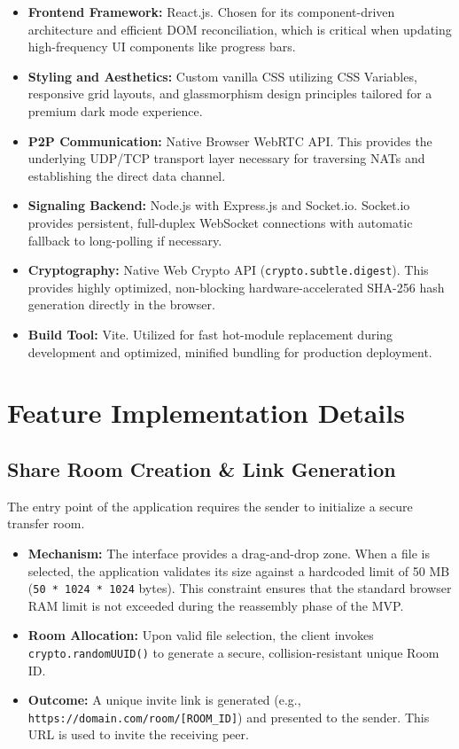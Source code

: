 \documentclass[12pt, a4paper]{article}
\begin{document}
\begin{itemize}
    \item \textbf{Frontend Framework:} React.js. Chosen for its component-driven architecture and efficient DOM reconciliation, which is critical when updating high-frequency UI components like progress bars.
    \item \textbf{Styling and Aesthetics:} Custom vanilla CSS utilizing CSS Variables, responsive grid layouts, and glassmorphism design principles tailored for a premium dark mode experience.
    \item \textbf{P2P Communication:} Native Browser WebRTC API. This provides the underlying UDP/TCP transport layer necessary for traversing NATs and establishing the direct data channel.
    \item \textbf{Signaling Backend:} Node.js with Express.js and Socket.io. Socket.io provides persistent, full-duplex WebSocket connections with automatic fallback to long-polling if necessary.
    \item \textbf{Cryptography:} Native Web Crypto API (\texttt{crypto.subtle.digest}). This provides highly optimized, non-blocking hardware-accelerated SHA-256 hash generation directly in the browser.
    \item \textbf{Build Tool:} Vite. Utilized for fast hot-module replacement during development and optimized, minified bundling for production deployment.
\end{itemize}

\section{Feature Implementation Details}

\subsection{Share Room Creation \& Link Generation}
The entry point of the application requires the sender to initialize a secure transfer room.
\begin{itemize}
    \item \textbf{Mechanism:} The interface provides a drag-and-drop zone. When a file is selected, the application validates its size against a hardcoded limit of 50 MB (\texttt{50 * 1024 * 1024} bytes). This constraint ensures that the standard browser RAM limit is not exceeded during the reassembly phase of the MVP.
    \item \textbf{Room Allocation:} Upon valid file selection, the client invokes \texttt{crypto.randomUUID()} to generate a secure, collision-resistant unique Room ID. 
    \item \textbf{Outcome:} A unique invite link is generated (e.g., \texttt{https://domain.com/room/[ROOM\_ID]}) and presented to the sender. This URL is used to invite the receiving peer.
\end{itemize}
\end{document}
